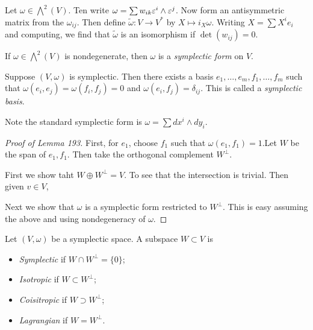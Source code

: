 \documentclass[twoside, 10pt]{article}
\begin{document}
    \begin{exm}
        Let $\omega \in \bigwedge^2(V)$. Ten write $\omega = \sum w_{ik} \varepsilon^i \wedge \varepsilon^j$. Now form an antisymmetric matrix from the $\omega_{ij}$. Then define $\widetilde{\omega}:V \to V^*$ by $X \mapsto i_X \omega$. Writing $X = \sum X^ie_i$ and computing, we find that $\widetilde{\omega}$ is an isomorphism if $\det (w_{ij}) = 0$.
    \end{exm}

    \begin{defn}
        If $\omega \in \bigwedge^2(V)$ is nondegenerate, then $\omega$ is a \textit{symplectic form} on $V$.
    \end{defn}

    \begin{lem}
        Suppose $(V,\omega)$ is symplectic. Then there exists a basis $e_1, \ldots, e_m, f_1, \ldots, f_m$ such that $\omega(e_i,e_j) = \omega(f_i,f_j) = 0$ and $\omega(e_i,f_j) = \delta_{ij}$. This is called a \textit{symplectic basis}.
    \end{lem}

    Note the standard symplectic form is $\omega = \sum dx^i \wedge dy_i$.

    \begin{proof}[Proof of Lemma 193]
        First, for $e_1$, choose $f_1$ such that $\omega(e_1,f_1) = 1. $Let $W$ be the span of $e_1,f_1$. Then take the orthogonal complement $W^{\perp}$.

        First we show taht $W \oplus W^{\perp} = V$. To see that the intersection is trivial. Then given $v \in V$, 

        Next we show that $\omega$ is a symplectic form restricted to $W^{\perp}$. This is easy assuming the above and using nondegeneracy of $\omega$.
    \end{proof}

    \begin{defn}
        Let $(V,\omega)$ be a symplectic space. A subspace $W \subset V$ is
        \begin{itemize}
            \item \textit{Symplectic} if $W \cap W^{\perp} = \{0\}$;
            \item \textit{Isotropic} if $W \subset W^{\perp}$;
            \item \textit{Coisitropic} if $W \supset W^{\perp}$;
            \item \textit{Lagrangian} if $W = W^{\perp}$.
        \end{itemize}
    \end{defn}
\end{document}
